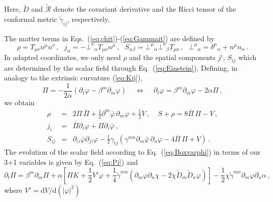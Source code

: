 \documentclass[11pt]{report}  %
\newcommand{\du}{\mathrm{d}}
\begin{document}
%
Here, $\tilde{D}$ and $\tilde{\mathcal{R}}$ denote the covariant
derivative and the Ricci tensor of the conformal metric
$\tilde{\gamma}_{ij}$, respectively.

The matter terms in Eqs.~(\ref{eq:chit})-(\ref{eq:Gammait})
are defined by
%
\begin{equation}
  \rho = T_{\mu\nu}n^{\mu}n^{\nu}\,,~~~
  j_{\alpha} = -\bot^{\nu}{}_{\alpha} T_{\mu\nu} n^{\mu}\,,~~~
  S_{\alpha\beta} = \bot^{\mu}{}_{\alpha} \bot^{\nu}{}_{\beta}
        T_{\mu\nu}\,,~~~
  \bot^{\mu}{}_{\alpha}=\delta^{\mu}{}_{\alpha}+n^{\mu}n_{\alpha}\,.
\end{equation}
%
In adapted coordinates, we only need $\rho$ and
the spatial components $j^i$, $S_{ij}$ which are determined
by the scalar field through Eq.~(\ref{eq:Einstein}),
Defining, in analogy to the extrinsic curvature (\ref{eq:Kij}),
%
\begin{equation}
  \Pi = -\frac{1}{2\alpha}
  (
  \partial_t \varphi - \beta^m \partial_m \varphi
  )
  ~~~~~\Leftrightarrow~~~~~
  \partial_t \varphi = \beta^m\partial_m \varphi-2\alpha \Pi\,,
  \label{eq:Pi}
\end{equation}
%
we obtain
%
\begin{eqnarray}
  \rho &=&
  2\Pi \,\bar{\Pi}
  +\frac{1}{2}\partial^m \bar{\varphi}\,\partial_m\varphi
  +\frac{1}{2}V\,,~~~~~
  S+\rho = 8\bar{\Pi}\,\Pi-V\,, \nonumber \\
  j_i &=&
  \bar{\Pi}\partial_i \varphi
  +\Pi \partial_i \bar{\varphi}\,, \nonumber\\
  S_{ij} &=& \partial_{(i}\bar{\varphi}\partial_{j)}\varphi
  - \frac{1}{2}\gamma_{ij}
  \left(
  \gamma^{mn}\partial_m \bar{\varphi}\,\partial_n \varphi
  -4\bar{\Pi} \,\Pi
  +V
  \right)\,. \label{eqn:projectionofstressenergy}
\end{eqnarray}
%
The evolution of the scalar field according to
Eq.~(\ref{eq:Boxvarphi}) in terms of our 3+1 variables
is given by Eq.~(\ref{eq:Pi}) and
%
\begin{equation}
  \partial_t \Pi =
  \beta^m \partial_m \Pi
  + \alpha
  \left[
  \Pi K
  + \frac{1}{2}V'\varphi
  + \frac{1}{4} \tilde{\gamma}^{mn}
  \left(
  \partial_m \varphi\partial_n\chi
  -2\chi\tilde{D}_m\tilde{D}_n \varphi
  \right)
  \right]
  -\frac{1}{2} \chi\tilde{\gamma}^{mn}\partial_m\varphi
  \partial_n \alpha
  \,,
\end{equation}
%
where $V'=\du V/\du (|\varphi|^2)$
\end{document}
